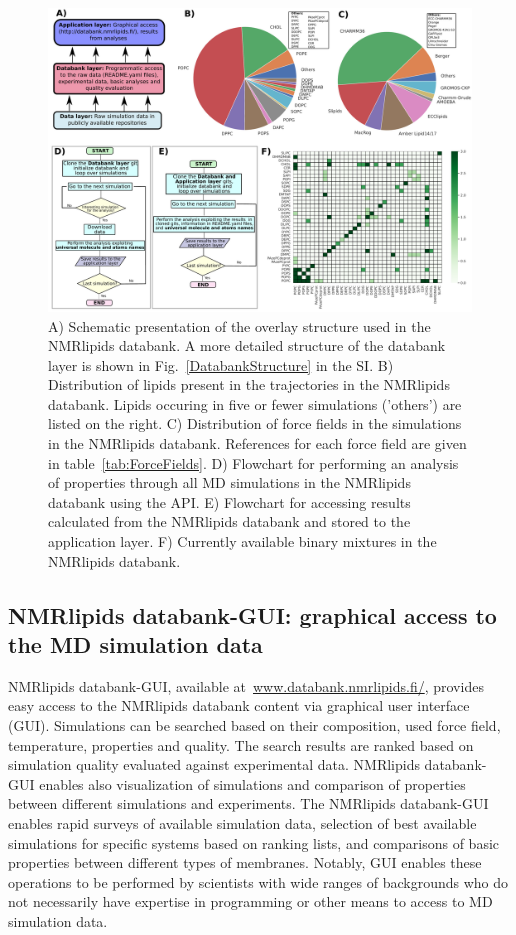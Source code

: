 \documentclass[fleqn,10pt]{wlscirep}
\begin{document}
\begin{figure}[t]
    \centering
    \includegraphics[width=\linewidth]{Figures/overlay3.pdf}
    \caption{A) Schematic presentation of the overlay structure used in the NMRlipids databank. A more detailed structure of the databank layer is shown in Fig.~\ref{DatabankStructure} in the SI.
    B) Distribution of lipids present in the trajectories in the NMRlipids databank. Lipids occuring in five or fewer simulations ('others') are listed on the right. 
    C) Distribution of force fields in the simulations in the NMRlipids databank. References for each force field are given in table~\ref{tab:ForceFields}.
    D) Flowchart for performing an analysis of properties through all MD simulations in the NMRlipids databank using the API.
    E) Flowchart for accessing results calculated from the NMRlipids databank and stored to the application layer.
    F) Currently available binary mixtures in the NMRlipids databank. 
    }
    \label{fig:overlay}
\end{figure}

\subsection{NMRlipids databank-GUI: graphical access to the MD simulation data}\label{section:access}
NMRlipids databank-GUI, available at~\url{www.databank.nmrlipids.fi/}, provides easy access to the NMRlipids databank content via graphical user interface (GUI). Simulations can be searched based on their composition, used force field, temperature, properties and quality. The search results are ranked based on simulation quality evaluated against experimental data. NMRlipids databank-GUI enables also visualization of simulations and comparison of properties between different simulations and experiments. The NMRlipids databank-GUI enables rapid surveys of available simulation data, selection of best available simulations for specific systems based on ranking lists, and comparisons of basic properties between different types of membranes. Notably, GUI enables these operations to be performed by scientists with wide ranges of backgrounds who do not necessarily have expertise in programming or other means to access to MD simulation data. 
\end{document}
